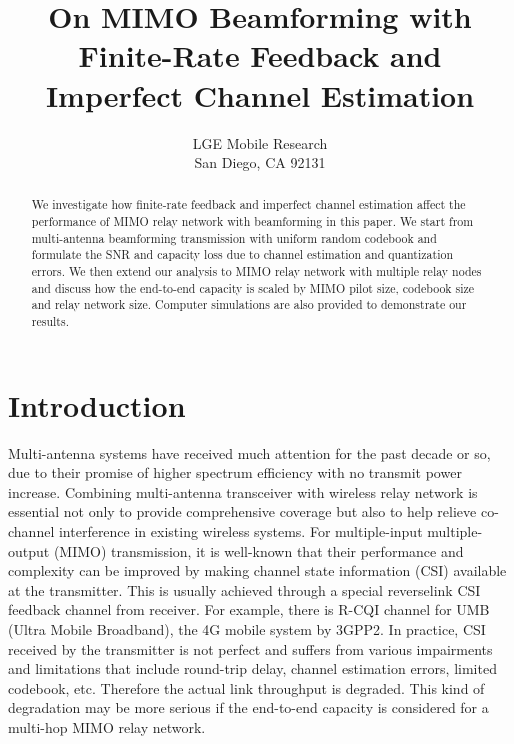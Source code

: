 \documentclass[10pt,fleqn, twocolumn]{IEEEtran}
\title{On MIMO Beamforming with Finite-Rate Feedback and Imperfect Channel Estimation}
\author{LGE Mobile Research\\San Diego, CA 92131}
\date{}
\begin{document}
\maketitle
\begin{abstract}\small
We investigate how finite-rate feedback and imperfect channel
estimation affect the performance of MIMO relay network with
beamforming in this paper. We start from multi-antenna beamforming
transmission with uniform random codebook and formulate the SNR
and capacity loss due to channel estimation and quantization
errors. We then extend our analysis to MIMO relay network with
multiple relay nodes and discuss how the end-to-end capacity is
scaled by MIMO pilot size, codebook size and relay network size.
Computer simulations are also provided to demonstrate our results.
\end{abstract}
\section{Introduction}
Multi-antenna systems have received much attention for the past
decade or so, due to their promise of higher spectrum efficiency
with no transmit power increase. Combining multi-antenna
transceiver with wireless relay network is essential not only to
provide comprehensive coverage but also to help relieve co-channel
interference in existing wireless systems. For multiple-input
multiple-output (MIMO) transmission, it is well-known that their
performance and complexity can be improved by making channel state
information (CSI) available at the transmitter. This is usually
achieved through a special reverselink CSI feedback channel from
receiver. For example, there is R-CQI channel for UMB (Ultra
Mobile Broadband), the 4G mobile system by 3GPP2. In practice, CSI
received by the transmitter is not perfect and suffers from
various impairments and limitations that include round-trip delay,
channel estimation errors, limited codebook, etc. Therefore the
actual link throughput is degraded. This kind of degradation may
be more serious if the end-to-end capacity is considered for a
multi-hop MIMO relay network.
\end{document}
